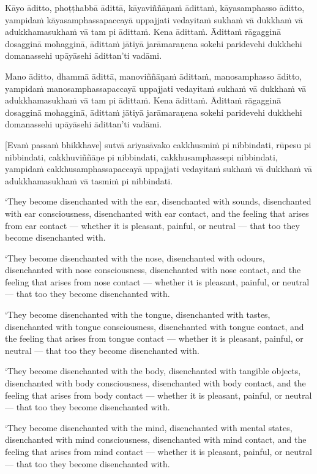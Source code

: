 Kāyo āditto, phoṭṭhabbā ādittā, kāyaviññāṇaṁ ādittaṁ, kāyasamphasso
āditto, yampidaṁ kāyasamphassapaccayā uppajjati vedayitaṁ sukhaṁ vā
dukkhaṁ vā adukkhamasukhaṁ vā tam pi ādittaṁ. Kena ādittaṁ. Ādittaṁ
rāgagginā dosagginā mohagginā, ādittaṁ jātiyā jarāmaraṇena sokehi
paridevehi dukkhehi domanassehi upāyāsehi ādittan'ti vadāmi.

Mano āditto, dhammā ādittā, manoviññāṇaṁ ādittaṁ, manosamphasso āditto,
yampidaṁ manosamphassapaccayā uppajjati vedayitaṁ sukhaṁ vā dukkhaṁ vā
adukkhamasukhaṁ vā tam pi ādittaṁ. Kena ādittaṁ. Ādittaṁ rāgagginā
dosagginā mohagginā, ādittaṁ jātiyā jarāmaraṇena sokehi paridevehi
dukkhehi domanassehi upāyāsehi ādittan'ti vadāmi.

\enlargethispage{2\baselineskip}

[Evaṁ passaṁ bhikkhave] sutvā ariyasāvako cakkhusmiṁ pi nibbindati,
rūpesu pi nibbindati, cakkhuviññāṇe pi nibbindati, cakkhusamphassepi
nibbindati, yampidaṁ cakkhusamphassapaccayā uppajjati vedayitaṁ sukhaṁ
vā dukkhaṁ vā adukkhamasukhaṁ vā tasmiṁ pi nibbindati.

\clearpage

\englishText
\markboth{\englishTitle}{\rightmark}

‘They become disenchanted with the ear, disenchanted with sounds,
disenchanted with ear consciousness, disenchanted with ear contact, and
the feeling that arises from ear contact --- whether it is pleasant,
painful, or neutral --- that too they become disenchanted with.

‘They become disenchanted with the nose, disenchanted with odours,
disenchanted with nose consciousness, disenchanted with nose contact,
and the feeling that arises from nose contact --- whether it is pleasant,
painful, or neutral --- that too they become disenchanted with.

‘They become disenchanted with the tongue, disenchanted with tastes,
disenchanted with tongue consciousness, disenchanted with tongue
contact, and the feeling that arises from tongue contact --- whether it is
pleasant, painful, or neutral --- that too they become disenchanted with.

‘They become disenchanted with the body, disenchanted with tangible
objects, disenchanted with body consciousness, disenchanted with body
contact, and the feeling that arises from body contact --- whether it is
pleasant, painful, or neutral --- that too they become disenchanted with.

‘They become disenchanted with the mind, disenchanted with mental
states, disenchanted with mind consciousness, disenchanted with mind
contact, and the feeling that arises from mind contact --- whether it is
pleasant, painful, or neutral --- that too they become disenchanted with.

